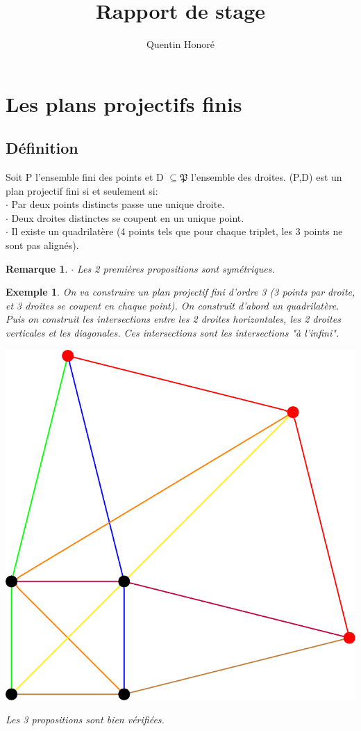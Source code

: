 \documentclass[a4paper]{article}
\title{Rapport de stage}
\newtheorem{Rem}{Remarque}[subsection]
\newtheorem{Ex}{Exemple}[subsection]
\begin{document}
\author{Quentin Honoré}
\date{}
\maketitle
\newpage
\tableofcontents
\newpage

\section{Les plans projectifs finis}
\subsection{Définition}
Soit P l'ensemble fini des points et D $ \subseteq \mathfrak{P} $ l'ensemble des droites.
(P,D) est un plan projectif fini si et seulement si: \\
$\cdot$ Par deux points distincts passe une unique droite. \\
$\cdot$ Deux droites distinctes se coupent en un unique point. \\
$\cdot$ Il existe un quadrilatère (4 points tels que pour chaque triplet, les 3 points ne sont pas alignés).

\begin{Rem}
$\cdot$ Les 2 premières propositions sont symétriques. \\ 
\end{Rem}
  
\begin{Ex}
  On va construire un plan projectif fini d'ordre 3 (3 points par droite, et 3 droites se coupent en chaque point). On construit d'abord un quadrilatère. Puis on construit les intersections entre les 2 droites horizontales, les 2 droites verticales et les diagonales. Ces intersections sont les intersections "à l'infini".
\begin{center}
\includegraphics{test_tikz.pdf}
\end{center}
Les 3 propositions sont bien vérifiées.
\end{Ex}
\end{document}
